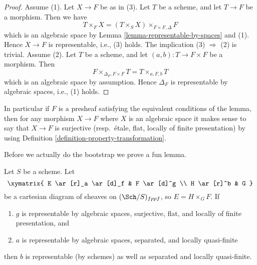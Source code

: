 \begin{proof}
Assume (1). Let $X \to F$ be as in (3). Let $T$ be a scheme, and let
$T \to F$ be a morphism. Then we have
$$
T \times_F X = (T \times_S X) \times_{F \times F, \Delta} F
$$
which is an algebraic space by
Lemma \ref{lemma-representable-by-spaces}
and (1). Hence $X \to F$ is representable, i.e., (3) holds.
The implication (3) $\Rightarrow$ (2) is trivial. Assume (2).
Let $T$ be a scheme, and let $(a, b) : T \to F \times F$ be a morphism.
Then
$$
F \times_{\Delta_F, F \times F} T = T \times_{a, F, b} T
$$
which is an algebraic space by assumption. Hence $\Delta_F$ is
representable by algebraic spaces, i.e., (1) holds.
\end{proof}

\noindent
In particular if $F$ is a presheaf satisfying the equivalent conditions of
the lemma, then for any morphism $X \to F$ where $X$ is an algebraic space
it makes sense to say that $X \to F$ is surjective (resp.\ \'etale, flat,
locally of finite presentation) by using
Definition \ref{definition-property-transformation}.

\medskip\noindent
Before we actually do the bootstrap we prove a fun lemma.

\begin{lemma}
\label{lemma-after-fppf-sep-lqf}
Let $S$ be a scheme.
Let
$$
\xymatrix{
E \ar[r]_a \ar[d]_f & F \ar[d]^g \\
H \ar[r]^b & G
}
$$
be a cartesian diagram of sheaves on $(\Sch/S)_{fppf}$, so
$E = H \times_G F$. If
\begin{enumerate}
\item $g$ is representable by algebraic spaces, surjective, flat, and
locally of finite presentation, and
\item $a$ is representable by algebraic spaces, separated, and
locally quasi-finite
\end{enumerate}
then $b$ is representable (by schemes) as well as separated and
locally quasi-finite.
\end{lemma}

